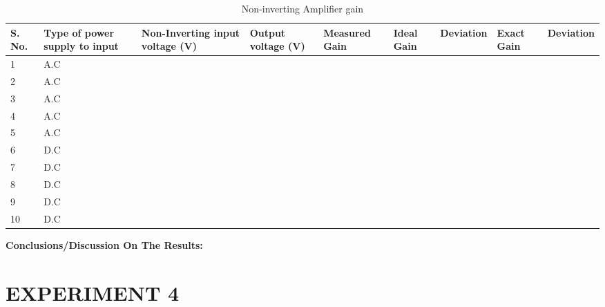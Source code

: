 \documentclass[9pt]{scrreprt}
\begin{document}
\begin{table}[h!]
\centering
\caption{Non-inverting Amplifier gain}
\begin{tabularx}{\textwidth}{|p{0.5cm}|p{1cm}|X|X|X|X|X|X|X|}
\hline
\textbf{S. No.} & \textbf{Type of power supply to input} & \textbf{Non-Inverting input voltage (V)} & \textbf{Output voltage (V)} & \textbf{Measured Gain} & \textbf{Ideal Gain} & \textbf{Deviation} & \textbf{Exact Gain} & \textbf{Deviation} \\ \hline
1  & \centering A.C &   &   &   &   &   &   &   \\ \hline
2  & \centering A.C &   &   &   &   &   &   &   \\ \hline
3  & \centering A.C &   &   &   &   &   &   &   \\ \hline
4  & \centering A.C &   &   &   &   &   &   &   \\ \hline
5  & \centering A.C &   &   &   &   &   &   &   \\ \hline
6  & \centering D.C &   &   &   &   &   &   &   \\ \hline
7  & \centering D.C &   &   &   &   &   &   &   \\ \hline
8  & \centering D.C &   &   &   &   &   &   &   \\ \hline
9  & \centering D.C &   &   &   &   &   &   &   \\ \hline
10 & \centering D.C &   &   &   &   &   &   &   \\ \hline
\end{tabularx}
\label{tab:Non-inverting Amplifier gain}
\end{table}

\textbf{Conclusions/Discussion On The Results:}

\newpage
\section*{\centering EXPERIMENT 4}
\end{document}
